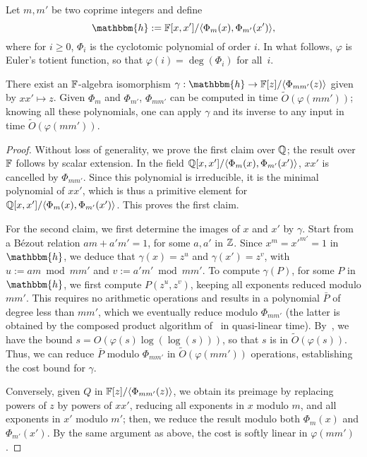 Let $m,m'$ be two coprime integers and define
$$\mathbbm{h}:=\F[x,x']/\langle \Phi_{m}(x), \Phi_{m'}(x')\rangle,$$
where for $i \ge 0$, $\Phi_i$ is the cyclotomic polynomial of order
$i$. In what follows, $\varphi$ is Euler's totient function, so that
$\varphi(i) = \deg(\Phi_i)$ for all~$i$.
\begin{lemma}
  There exist an $\mathbb{F}$-algebra isomorphism $\gamma: \mathbbm{h} \to
  \F[z]/\langle\Phi_{mm'}(z)\rangle$ given by $xx' \mapsto z$.  Given
  $\Phi_m$ and $\Phi_{m'}$, $\Phi_{mm'}$ can be computed in time
  $\tilde{O}(\varphi(mm'))$; knowing all these polynomials, one can
  apply $\gamma$ and its inverse to any input in time
  $\tilde{O}(\varphi(mm'))$.
\end{lemma}
\begin{proof}
  Without loss of generality, we prove the first claim over $\mathbb{Q}$; the
  result over $\mathbb{F}$ follows by scalar extension. In the field \sloppy
  $\mathbb{Q}[x,x']/\langle \Phi_{m}(x), \Phi_{m'}(x')\rangle$, $xx'$ is
  cancelled by $\Phi_{mm'}$. Since this polynomial is irreducible, it
  is the minimal polynomial of $xx'$, which is thus a primitive
  element for $\mathbb{Q}[x,x']/\langle \Phi_{m}(x),
  \Phi_{m'}(x')\rangle$. This proves the first claim.

  For the second claim, we first determine the images of $x$ and $x'$
  by $\gamma$. Start from a B\'ezout relation $am+ a'm'=1$, for some
  $a,a'$ in $\mathbb{Z}$.  Since $x^m = {x'}^{m'}=1$ in $\mathbbm{h}$, we
  deduce that $\gamma(x)=z^{u}$ and $\gamma(x') = z^{v}$, with $u:=am
  \bmod mm'$ and $v:=a'm' \bmod mm'$. To compute $\gamma(P)$, for some
  $P$ in $\mathbbm{h}$, we first compute $P(z^u, z^v)$, keeping all
  exponents reduced modulo $mm'$. This requires no arithmetic
  operations and results in a polynomial $\bar P$ of degree less than
  $mm'$, which we eventually reduce modulo $\Phi_{mm'}$ (the latter is
  obtained by the composed product algorithm of~\cite{BoFlSaSc06} in
  quasi-linear time).  By~\cite[Theorem~8.8.7]{BaSh96}, we have the
  bound $s = O(\varphi(s) \log(\log(s)))$, so that $s$ is in
  $\tilde{O}(\varphi(s))$. Thus, we can reduce $\bar P$ modulo
  $\Phi_{mm'}$ in $\tilde{O}(\varphi(mm'))$ operations, establishing
  the cost bound for $\gamma$.

Conversely, given $Q$ in $\mathbb{F}[z]/\langle\Phi_{mm'}(z)\rangle$, we
obtain its preimage by replacing powers of $z$ by powers of $xx'$,
reducing all exponents in $x$ modulo $m$, and all exponents in $x'$
modulo $m'$; then, we reduce the result modulo both $\Phi_m(x)$ and
$\Phi_{m'}(x')$.  By the same argument as above, the cost is softly
linear in $\varphi(mm')$.
\end{proof}

